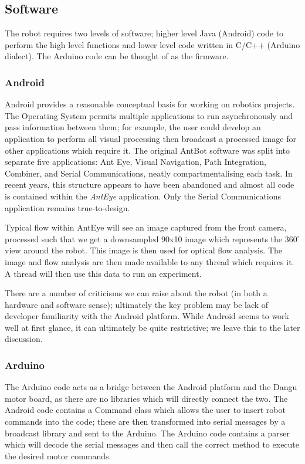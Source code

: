 \documentclass[a4paper,11pt,twoside,openright]{article}
\begin{document}
\subsection{ Software }
The robot requires two levels of software; higher level Java (Android) code to
perform the high level functions and lower level code written in C/C++
(Arduino dialect). The Arduino code can be thought of as the firmware.

\subsubsection{ Android } \label{subsubsec:droid}
Android provides a reasonable conceptual basis for working on robotics
projects. The Operating System permits multiple applications to run
asynchronously and pass information between them; for example, the
user could develop an application to perform all visual processing
then broadcast a processed image for other applications which require
it. The original AntBot software was split into separate five
applications: Ant Eye, Visual Navigation, Path Integration, Combiner,
and Serial Communications, neatly compartmentalising each task.
In recent years, this structure appears to have been abandoned and
almost all code is contained within the \textit{AntEye}
application. Only the Serial Communications application remains
true-to-design.
\newline
\par

Typical flow within AntEye will see an image captured from the front camera,
processed such that we get a downsampled 90x10 image which represents the
$360^{\circ}$ view around the robot. This image is then used for optical
flow analysis. The image and flow analysis are then made available to any thread
which requires it. A thread will then use this data to run an experiment.
\newline
\par

There are a number of criticisms we can raise about the robot (in both a hardware
and software sense); ultimately the key problem may be lack of developer
familiarity with the Android platform.  While Android seems to work well at
first glance, it can ultimately be quite restrictive; we leave this to the
later discussion.

\subsubsection{ Arduino }
The Arduino code acts as a bridge between the Android platform and the Dangu
motor board, as there are no libraries which will directly connect the two.
The Android code contains a Command class which allows the user to insert robot
commands into the code; these are then transformed into serial messages by a
broadcast library \cite{Eberding2016} and sent to the Arduino. The Arduino code
contains a parser which will decode the serial messages and then call the
correct method to execute the desired motor commands.
\end{document}
